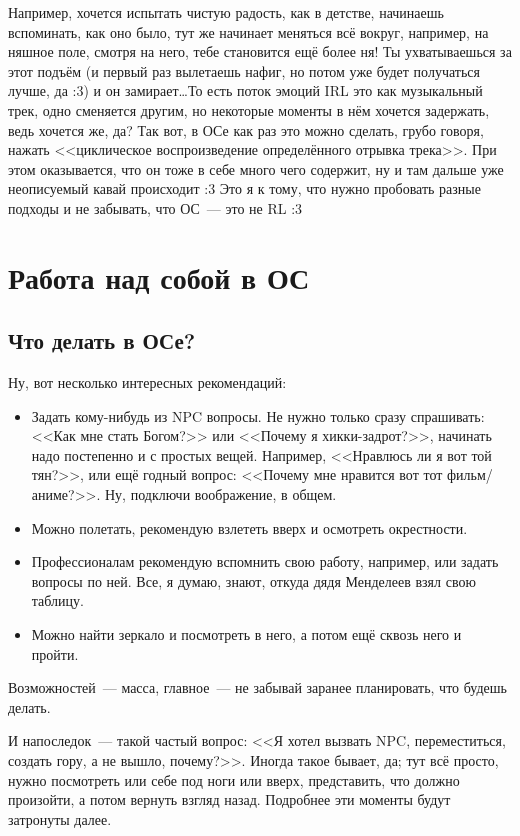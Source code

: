 \documentclass[a4paper,14pt,oneside]{memoir}
\begin{document}
Например, хочется испытать чистую радость, как в детстве, начинаешь вспоминать, как оно было, тут же начинает меняться всё вокруг, например, на няшное поле, смотря на него, тебе становится ещё более ня! Ты ухватываешься за этот подъём (и первый раз вылетаешь нафиг, но потом уже будет получаться лучше, да :3) и он замирает\ldots То есть поток эмоций IRL это как музыкальный трек, одно сменяется другим, но некоторые моменты в нём хочется задержать, ведь хочется же, да? Так вот, в ОСе как раз это можно сделать, грубо говоря, нажать <<циклическое воспроизведение определённого отрывка трека>>. При этом оказывается, что он тоже в себе много чего содержит, ну и там дальше уже неописуемый кавай происходит :3 Это я к тому, что нужно пробовать разные подходы и не забывать, что ОС~--- это не RL :3




\chapter{Работа над собой в ОС}


\section{Что делать в ОСе?}
Ну, вот несколько интересных рекомендаций:
\begin{itemize}
\item Задать кому-нибудь из NPC вопросы. Не нужно только сразу спрашивать: <<Как мне стать Богом?>> или <<Почему я хикки-задрот?>>, начинать надо постепенно и с простых вещей. Например, <<Нравлюсь ли я вот той тян?>>, или ещё годный вопрос: <<Почему мне нравится вот тот фильм/ани\-ме?>>. Ну, подключи воображение, в общем.
\item Можно полетать, рекомендую взлететь вверх и осмотреть окрестности.
\item Профессионалам рекомендую вспомнить свою работу, например, или задать вопросы по ней. Все, я думаю, знают, откуда дядя Менделеев взял свою таблицу.
\item Можно найти зеркало и посмотреть в него, а потом ещё сквозь него и пройти.
\end{itemize}

Возможностей~--- масса, главное~--- не забывай заранее планировать, что будешь делать.

И напоследок~--- такой частый вопрос: <<Я хотел вызвать NPC, переместиться, создать гору, а не вышло, почему?>>. Иногда такое бывает, да; тут всё просто, нужно посмотреть или себе под ноги или вверх, представить, что должно произойти, а потом вернуть взгляд назад. Подробнее эти моменты будут затронуты далее.
\end{document}
